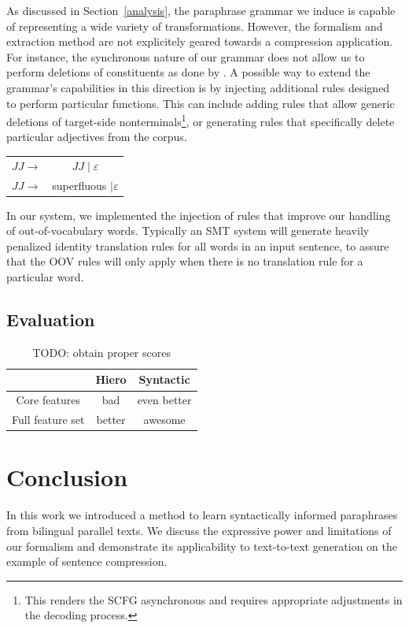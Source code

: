 \documentclass[11pt]{article}
\begin{document}
As discussed in Section~\ref{analysis}, the paraphrase grammar we
induce is capable of representing a wide variety of
transformations. However, the formalism and extraction method are not
explicitely geared towards a compression application. For instance,
the synchronous nature of our grammar does not allow us to perform
deletions of constituents as done by .  A possible
way to extend the grammar's capabilities in this direction is by
injecting additional rules designed to perform particular
functions. This can include adding rules that allow generic deletions
of target-side nonterminals\footnote{This renders the SCFG
  asynchronous and requires appropriate adjustments in the decoding
  process.}, or generating rules that specifically delete particular
adjectives from the corpus.
\begin{center}
\begin{tabular}{cc}
 $\mathit{JJ} \rightarrow$ & $\mathit{JJ} \mid \varepsilon$ \\
 $\mathit{JJ} \rightarrow$ & superfluous $\mid \varepsilon$ \\
\end{tabular}
\end{center}
In our system, we implemented the injection of rules that improve our
handling of out-of-vocabulary words. Typically an SMT system will
generate heavily penalized identity translation rules for all words in
an input sentence, to assure that the OOV rules will only apply when
there is no translation rule for a particular word.


\subsection{Evaluation} \label{evaluation}

\begin{table}
\begin{center}
\begin{tabular}{|c|c|c|}
  \hline
  & Hiero & Syntactic \\
  \hline
  Core features & bad & even better \\
  Full feature set & better & awesome \\
  \hline
\end{tabular}
\end{center}
\caption{TODO: obtain proper scores}
\end{table}


\section{Conclusion} \label{conclusion}

In this work we introduced a method to learn syntactically informed
paraphrases from bilingual parallel texts. We discuss the expressive
power and limitations of our formalism and demonstrate its
applicability to text-to-text generation on the example of sentence
compression.




\nocite{*}
\end{document}

